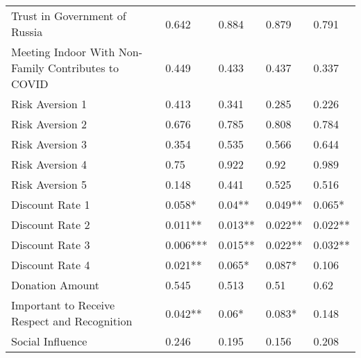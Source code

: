 \begin{table}[ht]
\begin{tabular}{lllll}
  Trust in Government of Russia & 0.642 & 0.884 & 0.879 & 0.791 \\ 
  Meeting Indoor With Non-Family Contributes to COVID & 0.449 & 0.433 & 0.437 & 0.337 \\ 
  Risk Aversion 1 & 0.413 & 0.341 & 0.285 & 0.226 \\ 
  Risk Aversion 2 & 0.676 & 0.785 & 0.808 & 0.784 \\ 
  Risk Aversion 3 & 0.354 & 0.535 & 0.566 & 0.644 \\ 
  Risk Aversion 4 & 0.75 & 0.922 & 0.92 & 0.989 \\ 
  Risk Aversion 5 & 0.148 & 0.441 & 0.525 & 0.516 \\ 
  Discount Rate 1 & 0.058* & 0.04** & 0.049** & 0.065* \\ 
  Discount Rate 2 & 0.011** & 0.013** & 0.022** & 0.022** \\ 
  Discount Rate 3 & 0.006*** & 0.015** & 0.022** & 0.032** \\ 
  Discount Rate 4 & 0.021** & 0.065* & 0.087* & 0.106 \\ 
  Donation Amount & 0.545 & 0.513 & 0.51 & 0.62 \\ 
  Important to Receive Respect and Recognition & 0.042** & 0.06* & 0.083* & 0.148 \\ 
  Social Influence & 0.246 & 0.195 & 0.156 & 0.208 \\ 
   \hline
\end{tabular}
\end{table}
